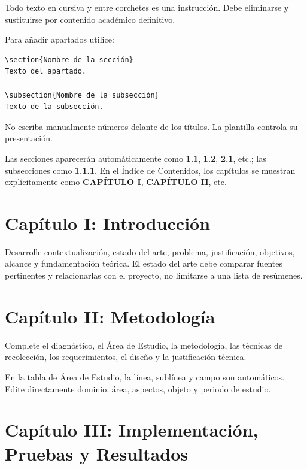 \documentclass[12pt,a4paper,oneside]{report}
\begin{document}
Todo texto en cursiva y entre corchetes es una instrucción. Debe eliminarse y sustituirse por contenido académico definitivo.

Para añadir apartados utilice:

\begin{lstlisting}
\section{Nombre de la sección}
Texto del apartado.

\subsection{Nombre de la subsección}
Texto de la subsección.
\end{lstlisting}

No escriba manualmente números delante de los títulos. La plantilla controla su presentación.

Las secciones aparecerán automáticamente como \textbf{1.1}, \textbf{1.2}, \textbf{2.1}, etc.; las subsecciones como \textbf{1.1.1}. En el Índice de Contenidos, los capítulos se muestran explícitamente como \textbf{CAPÍTULO I}, \textbf{CAPÍTULO II}, etc.

\section{Capítulo I: Introducción}

Desarrolle contextualización, estado del arte, problema, justificación, objetivos, alcance y fundamentación teórica. El estado del arte debe comparar fuentes pertinentes y relacionarlas con el proyecto, no limitarse a una lista de resúmenes.

\section{Capítulo II: Metodología}

Complete el diagnóstico, el Área de Estudio, la metodología, las técnicas de recolección, los requerimientos, el diseño y la justificación técnica.

En la tabla de Área de Estudio, la línea, sublínea y campo son automáticos. Edite directamente dominio, área, aspectos, objeto y periodo de estudio.

\section{Capítulo III: Implementación, Pruebas y Resultados}
\end{document}
